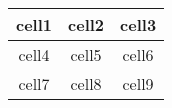 \documentclass{ctexart}
\begin{document}
\begin{center}
    \begin{tabular}{ |c| c| c| }
     \hline
      cell1 & cell2 & cell3 \\ 
      \hline
      cell4 & cell5 & cell6 \\  
      \hline
      cell7 & cell8 & cell9  \\
      \hline
    \end{tabular}
    \end{center}
\end{document}
